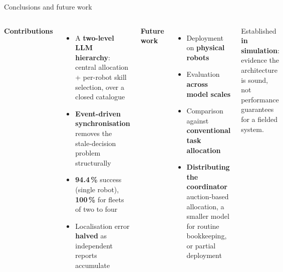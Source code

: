 \documentclass[aspectratio=169,10pt]{beamer}
\newcommand{\callout}[2][upmblue]{%
  \begin{beamercolorbox}[wd=\linewidth,sep=6pt,rounded=false]{}%
    \color{#1}\small #2%
  \end{beamercolorbox}%
}
\begin{document}
\begin{frame}{Conclusions and future work}
  \begin{columns}[T]
  \textbf{\color{upmnavy}Contributions}
  \begin{itemize}\small
    \item A \textbf{two-level LLM hierarchy}: central allocation +
      per-robot skill selection, over a closed catalogue
    \item \textbf{Event-driven synchronisation} removes the
      stale-decision problem structurally
    \item \textbf{94.4\,\%} success (single robot), \textbf{100\,\%} for
      fleets of two to four
    \item Localisation error \textbf{halved} as independent reports
      accumulate
  \end{itemize}
  \textbf{\color{upmnavy}Future work}
  \begin{itemize}\small
    \item Deployment on \textbf{physical robots}
    \item Evaluation \textbf{across model scales}
    \item Comparison against \textbf{conventional task allocation}
    \item \textbf{Distributing the coordinator}\\[-1pt]
      {\footnotesize\color{upmgray} auction-based allocation, a smaller
      model for routine bookkeeping, or partial deployment}
  \end{itemize}
  \vspace{4pt}
  \callout[upmblue]{\footnotesize Established \textbf{in simulation}:
  evidence the architecture is sound, not performance guarantees for a
  fielded system.}
  \end{columns}
\end{frame}
\end{document}
